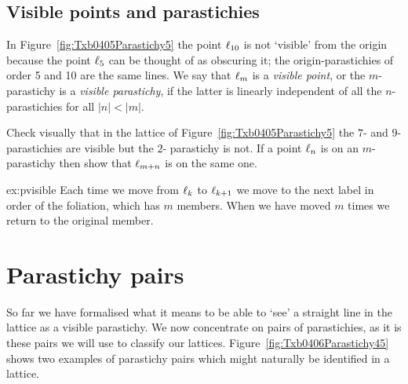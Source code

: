 \subsection{Visible points and parastichies}
In Figure~\ref{fig:Txb0405Parastichy5} the point $\ell_{{10}}$ is not `visible' from the origin because the point $\ell_{{5}}$ can be thought of as obscuring it; the 
origin-parastichies of order 5 and 10 are the same lines. 
We say that $\ell_{{m}}$ is a \emph{visible point}, or the $m$-parastichy is a \emph{visible parastichy}, if the latter is linearly independent of all the $n$-parastichies for all $|n|<|m|$. 
\begin{jExercise}\label{ex:pvisible}
	Check  visually that in the lattice of Figure~\ref{fig:Txb0405Parastichy5} the $7$- and $9$- parastichies are visible but the $2$- parastichy is not.
If a point $\ell_{{n}}$ is on an $m$-parastichy then show that $\ell_{{m+n}}$ is on the same one.
\label{ex:bb}
\end{jExercise}
\begin{jAnswer}{ex:pvisible}
	Each time we move from $\ell_{{k}}$ to $\ell_{{k+1}}$ we move to the next label in order of the foliation, which has $m$ members. When we have moved $m$ times we return to the original member.
\end{jAnswer}


\section{Parastichy pairs}

So far we have formalised what it means to be able to `see' a straight line in the lattice as a visible parastichy. 
We now concentrate on pairs of parastichies, as it is these pairs we will use to classify our lattices. Figure~\ref{fig:Txb0406Parastichy45} shows two examples of parastichy pairs which might naturally be identified in a lattice. 





